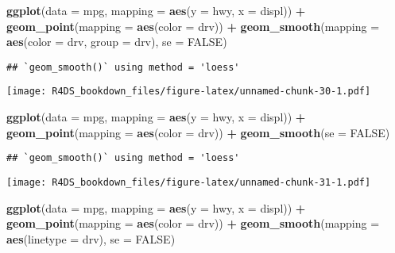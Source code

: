 \documentclass[]{article}
\newenvironment{Shaded}{\begin{snugshade}}{\end{snugshade}}
\newcommand{\KeywordTok}[1]{\textcolor[rgb]{0.13,0.29,0.53}{\textbf{#1}}}
\newcommand{\DataTypeTok}[1]{\textcolor[rgb]{0.13,0.29,0.53}{#1}}
\newcommand{\StringTok}[1]{\textcolor[rgb]{0.31,0.60,0.02}{#1}}
\newcommand{\OtherTok}[1]{\textcolor[rgb]{0.56,0.35,0.01}{#1}}
\newcommand{\OperatorTok}[1]{\textcolor[rgb]{0.81,0.36,0.00}{\textbf{#1}}}
\newcommand{\NormalTok}[1]{#1}
\theoremstyle{definition}
\theoremstyle{definition}
\theoremstyle{definition}
\theoremstyle{remark}
\begin{document}
\begin{Shaded}
\begin{Highlighting}[]
\KeywordTok{ggplot}\NormalTok{(}\DataTypeTok{data =}\NormalTok{ mpg, }\DataTypeTok{mapping =} \KeywordTok{aes}\NormalTok{(}\DataTypeTok{y =}\NormalTok{ hwy, }\DataTypeTok{x =}\NormalTok{ displ)) }\OperatorTok{+}\StringTok{ }
\StringTok{  }\KeywordTok{geom_point}\NormalTok{(}\DataTypeTok{mapping =} \KeywordTok{aes}\NormalTok{(}\DataTypeTok{color =}\NormalTok{ drv)) }\OperatorTok{+}
\StringTok{  }\KeywordTok{geom_smooth}\NormalTok{(}\DataTypeTok{mapping =} \KeywordTok{aes}\NormalTok{(}\DataTypeTok{color =}\NormalTok{ drv, }\DataTypeTok{group =}\NormalTok{ drv), }\DataTypeTok{se =} \OtherTok{FALSE}\NormalTok{)}
\end{Highlighting}
\end{Shaded}

\begin{verbatim}
## `geom_smooth()` using method = 'loess'
\end{verbatim}

\texttt{[image: R4DS\_bookdown\_files/figure-latex/unnamed-chunk-30-1.pdf]}

\begin{Shaded}
\begin{Highlighting}[]
\KeywordTok{ggplot}\NormalTok{(}\DataTypeTok{data =}\NormalTok{ mpg, }\DataTypeTok{mapping =} \KeywordTok{aes}\NormalTok{(}\DataTypeTok{y =}\NormalTok{ hwy, }\DataTypeTok{x =}\NormalTok{ displ)) }\OperatorTok{+}\StringTok{ }
\StringTok{  }\KeywordTok{geom_point}\NormalTok{(}\DataTypeTok{mapping =} \KeywordTok{aes}\NormalTok{(}\DataTypeTok{color =}\NormalTok{ drv)) }\OperatorTok{+}
\StringTok{  }\KeywordTok{geom_smooth}\NormalTok{(}\DataTypeTok{se =} \OtherTok{FALSE}\NormalTok{)}
\end{Highlighting}
\end{Shaded}

\begin{verbatim}
## `geom_smooth()` using method = 'loess'
\end{verbatim}

\texttt{[image: R4DS\_bookdown\_files/figure-latex/unnamed-chunk-31-1.pdf]}

\begin{Shaded}
\begin{Highlighting}[]
\KeywordTok{ggplot}\NormalTok{(}\DataTypeTok{data =}\NormalTok{ mpg, }\DataTypeTok{mapping =} \KeywordTok{aes}\NormalTok{(}\DataTypeTok{y =}\NormalTok{ hwy, }\DataTypeTok{x =}\NormalTok{ displ)) }\OperatorTok{+}\StringTok{ }
\StringTok{  }\KeywordTok{geom_point}\NormalTok{(}\DataTypeTok{mapping =} \KeywordTok{aes}\NormalTok{(}\DataTypeTok{color =}\NormalTok{ drv)) }\OperatorTok{+}
\StringTok{  }\KeywordTok{geom_smooth}\NormalTok{(}\DataTypeTok{mapping =} \KeywordTok{aes}\NormalTok{(}\DataTypeTok{linetype =}\NormalTok{ drv), }\DataTypeTok{se =} \OtherTok{FALSE}\NormalTok{)}
\end{Highlighting}
\end{Shaded}
\end{document}
